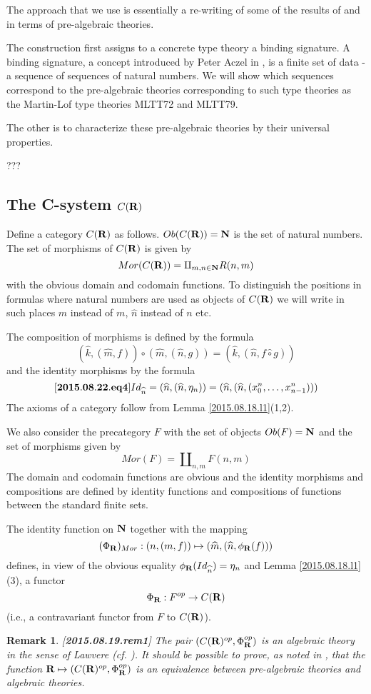\documentclass[11pt]{article}
\newenvironment{eq}{\begin{equation}}{\end{equation}}
\newtheorem{remark}[proposition]{Remark}
\newcommand{\llabel}[1]{\label{#1}[{\bf #1}]}
\newcommand{\sr}{\rightarrow}
\newcommand{\nn}{{\bf N\rm}}
\newcommand{\rr}{{\bf R}}
\newcommand{\wh}{\widehat}
\newcommand{\hc}{\wh{\circ}}
\begin{document}
The approach that we use is essentially a re-writing of some of the results of \cite{FPT} and \cite{HM2007} in terms of pre-algebraic theories. 

The construction first assigns to a concrete type theory a binding signature. A binding signature, a concept introduced by Peter Aczel in \cite{Aczel},  is a finite set of data - a sequence of sequences of natural numbers. We will show which sequences correspond to the pre-algebraic theories corresponding to such  type theories as the Martin-Lof type theories MLTT72 and MLTT79.

The other is to characterize these pre-algebraic theories by their universal properties. 

???



\subsection{The C-system $C(\rr)$}
%

Define a category $C(\rr)$ as follows. $Ob(C(\rr))=\nn$ is the set of natural numbers. The set of morphisms of $C(\rr)$ is given by
%
$$Mor(C(\rr))=\amalg_{m,n\in\nn}R(n,m)$$
%
with the obvious domain and codomain functions. To distinguish the positions in formulas where natural numbers are used as objects of $C(\rr)$ we will write in such places $\wh{m}$ instead of $m$, $\wh{n}$ instead of $n$ etc.  

The composition of morphisms is defined by the formula
%
$$(\wh{k},(\wh{m},f))\circ (\wh{m},(\wh{n},g))=(\wh{k},(\wh{n},f\hc g))$$
%
and the identity morphisms by the formula
%
\begin{eq}
\llabel{2015.08.22.eq4}
Id_{\wh{n}}=(\wh{n},(\wh{n},\eta_n))=(\wh{n},(\wh{n},(x_0^n,\dots,x^n_{n-1})))
\end{eq}
%
%
The axioms of a category follow from Lemma \ref{2015.08.18.l1}(1,2). 

We also consider the precategory $F$ with the set of objects $Ob(F)=\nn$ and the set of morphisms given by
%
$$Mor(F)=\amalg_{n,m}F(n,m)$$
%
The domain and codomain functions are obvious and the identity morphisms and compositions are defined by identity functions and compositions of functions between the standard finite sets. 

The identity function on $\nn$ together with the mapping
%
$$(\Phi_{\rr})_{Mor}:(n,(m,f))\mapsto (\wh{m},(\wh{n},\phi_{\rr}(f)))$$
%
defines, in view of the obvious equality $\phi_{\rr}(Id_{\wh{n}})=\eta_{n}$ and Lemma \ref{2015.08.18.l1}(3), a functor
%
$$\Phi_{\rr}:F^{op}\sr C(\rr)$$
%
(i.e., a contravariant functor from $F$ to $C(\rr)$). 
%
\begin{remark}\rm
\llabel{2015.08.19.rem1}
The pair $(C(\rr)^{op},\Phi^{op}_{\rr})$ is an algebraic theory in the sense of Lawvere (cf. \cite[Definition on p.62]{Lawvere}). It should be possible to prove, as noted in \cite[after Theorem 3.3]{FPT}, that the function $\rr\mapsto (C(\rr)^{op},\Phi^{op}_{\rr})$ is an equivalence between pre-algebraic theories and algebraic theories. 
\end{remark}
%
\end{document}
